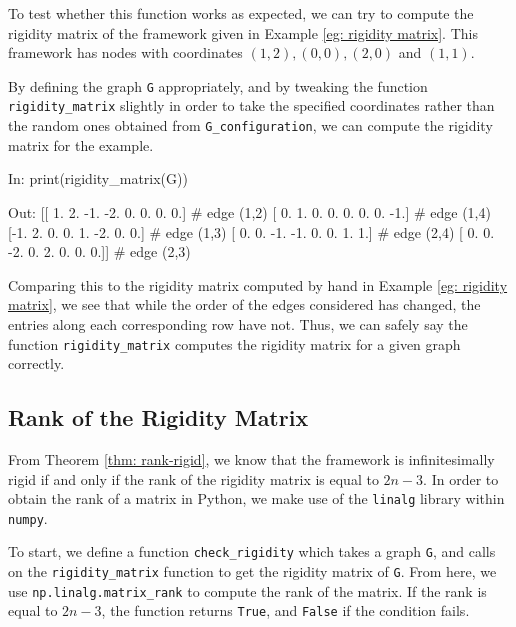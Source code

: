 \begin{flushleft}
To test whether this function works as expected, we can try to compute the rigidity matrix of the framework given in Example \ref{eg: rigidity matrix}. This framework has nodes with coordinates $(1,2), (0,0), (2,0)$ and $(1,1)$. 
\end{flushleft}

\begin{flushleft}
By defining the graph \texttt{G} appropriately, and by tweaking the function \texttt{rigidity\_matrix} slightly in order to take the specified coordinates rather than the random ones obtained from \texttt{G\_configuration}, we can compute the rigidity matrix for the example.
\end{flushleft}

\begin{code}
In: print(rigidity_matrix(G))

Out: [[ 1.  2. -1. -2.  0.  0.  0.  0.]    # edge (1,2)
      [ 0.  1.  0.  0.  0.  0.  0. -1.]    # edge (1,4)
      [-1.  2.  0.  0.  1. -2.  0.  0.]    # edge (1,3)
      [ 0.  0. -1. -1.  0.  0.  1.  1.]    # edge (2,4)
      [ 0.  0. -2.  0.  2.  0.  0.  0.]]   # edge (2,3)
\end{code}    

\begin{flushleft}
Comparing this to the rigidity matrix computed by hand in Example \ref{eg: rigidity matrix}, we see that while the order of the edges considered has changed, the entries along each corresponding row have not. Thus, we can safely say the function \texttt{rigidity\_matrix} computes the rigidity matrix for a given graph correctly.
\end{flushleft}

\subsection{Rank of the Rigidity Matrix}

\begin{flushleft}
From Theorem \ref{thm: rank-rigid}, we know that the framework is infinitesimally rigid if and only if the rank of the rigidity matrix is equal to $2n-3$. In order to obtain the rank of a matrix in Python, we make use of the \texttt{linalg} library within \texttt{numpy}. 
\end{flushleft}

\begin{flushleft}
To start, we define a function \texttt{check\_rigidity} which takes a graph \texttt{G}, and calls on the \texttt{rigidity\_matrix} function to get the rigidity matrix of \texttt{G}. From here, we use \texttt{np.linalg.matrix\_rank} to compute the rank of the matrix. If the rank is equal to $2n-3$, the function returns \texttt{True}, and \texttt{False} if the condition fails.
\end{flushleft}

